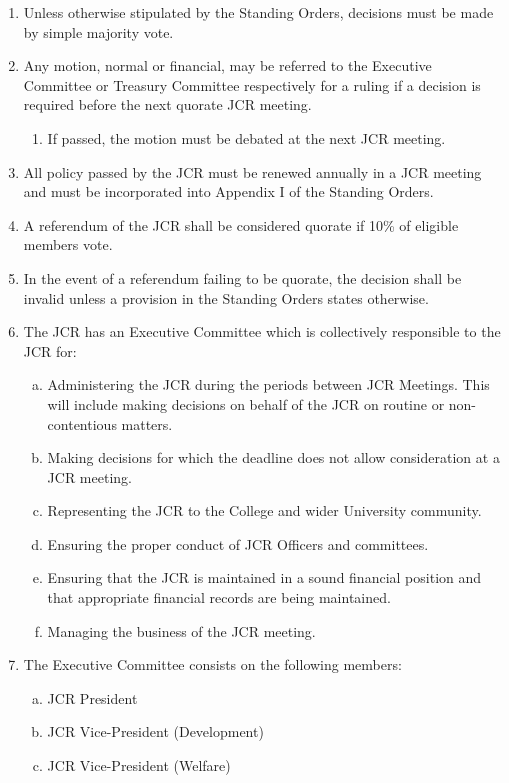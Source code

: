 \documentclass[12pt]{article}  %
\begin{document}
\begin{enumerate}
    \item Unless otherwise stipulated by the Standing Orders, decisions must be made by simple majority vote.
    \item Any motion, normal or financial, may be referred to the Executive Committee or Treasury Committee respectively for a ruling if a decision is required before the next quorate JCR meeting.
    \begin{enumerate}
        \item If passed, the motion must be debated at the next JCR meeting.
    \end{enumerate}
    \item All policy passed by the JCR must be renewed annually in a JCR meeting and must be incorporated into Appendix I of the Standing Orders.
    \item A referendum of the JCR shall be considered quorate if 10\% of eligible members vote.
    \item In the event of a referendum failing to be quorate, the decision shall be invalid unless a provision in the Standing Orders states otherwise.
    \item The JCR has an Executive Committee which is collectively responsible to the JCR for:
    \begin{enumerate}[(a)]
        \item Administering the JCR during the periods between JCR Meetings. This will include making decisions on behalf of the JCR on routine or non-contentious matters.
        \item Making decisions for which the deadline does not allow consideration at a JCR meeting.
        \item Representing the JCR to the College and wider University community.
        \item Ensuring the proper conduct of JCR Officers and committees.
        \item Ensuring that the JCR is maintained in a sound financial position and that appropriate financial records are being maintained.
        \item Managing the business of the JCR meeting.
    \end{enumerate}
    \item The Executive Committee consists on the following members:
    \begin{enumerate}[(a)]
        \item JCR President
        \item JCR Vice-President (Development)
        \item JCR Vice-President (Welfare)

\end{enumerate}
\end{enumerate}
\end{document}
